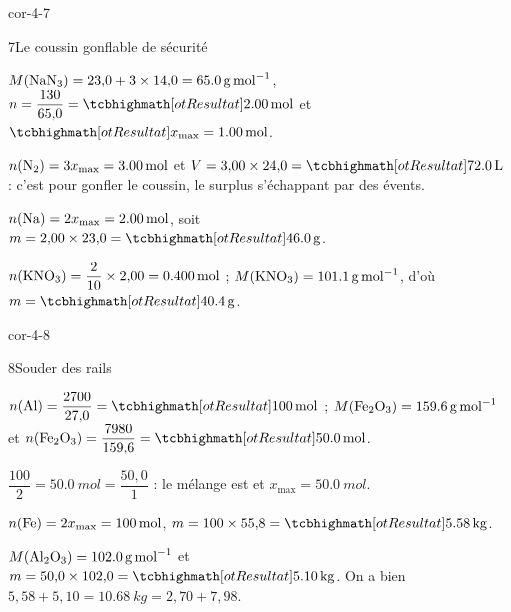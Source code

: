 \begin{blocLivre}{cor-4-7}
\begin{corrige}{7}{Le coussin gonflable de sécurité}
\begin{questions}
\item $M(\ce{NaN3})=23{,}0+3\times14{,}0=\qty{65,0}{g.mol^{-1}}$, $n=\dfrac{130}{65{,}0}=\res{\qty{2,00}{mol}}$ et $\res{x_\mathrm{max}=\qty{1,00}{mol}}$.
\item $n(\ce{N2})=3x_\mathrm{max}=\qty{3,00}{mol}$ et $V=3{,}00\times24{,}0=\res{\qty{72,0}{L}}$ : c'est  pour gonfler le coussin, le surplus
s'échappant par des évents.
\item $n(\ce{Na})=2x_\mathrm{max}=\qty{2,00}{mol}$, soit $m=2{,}00\times23{,}0=\res{\qty{46,0}{g}}$.
\item $n(\ce{KNO3})=\dfrac{2}{10}\times2{,}00=\qty{0,400}{mol}$ ; $M(\ce{KNO3})=\qty{101,1}{g.mol^{-1}}$, d'où $m=\res{\qty{40,4}{g}}$.
\end{questions}
\end{corrige}
\end{blocLivre}
\begin{blocLivre}{cor-4-8}
\begin{corrige}{8}{Souder des rails}
\begin{questions}
\item $n(\ce{Al})=\dfrac{2700}{27{,}0}=\res{\qty{100}{mol}}$ ; $M(\ce{Fe2O3})=\qty{159,6}{g.mol^{-1}}$ et $n(\ce{Fe2O3})=\dfrac{7980}{159{,}6}=\res{\qty{50,0}{mol}}$.
\item $\dfrac{100}{2}=\qty{50,0}{mol}=\dfrac{50{,}0}{1}$ : le mélange est  et $x_\mathrm{max}=\qty{50,0}{mol}$.
\item $n(\ce{Fe})=2x_\mathrm{max}=\qty{100}{mol}$, $m=100\times55{,}8=\res{\qty{5,58}{kg}}$.
\item $M(\ce{Al2O3})=\qty{102,0}{g.mol^{-1}}$ et $m=50{,}0\times102{,}0=\res{\qty{5,10}{kg}}$. On a bien $5{,}58+5{,}10=\qty{10,68}{kg}=2{,}70+7{,}98$.
\end{questions}
\end{corrige}
\end{blocLivre}
